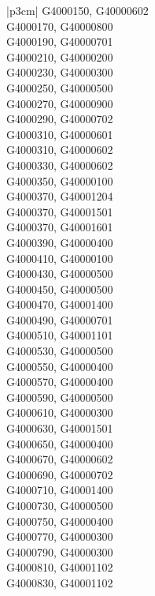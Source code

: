 \begin{customLongTable}{ |p{3cm}| }
G4000150, G40000602 \\ \hline
G4000170, G40000800 \\ \hline
G4000190, G40000701 \\ \hline
G4000210, G40000200 \\ \hline
G4000230, G40000300 \\ \hline
G4000250, G40000500 \\ \hline
G4000270, G40000900 \\ \hline
G4000290, G40000702 \\ \hline
G4000310, G40000601 \\ \hline
G4000310, G40000602 \\ \hline
G4000330, G40000602 \\ \hline
G4000350, G40000100 \\ \hline
G4000370, G40001204 \\ \hline
G4000370, G40001501 \\ \hline
G4000370, G40001601 \\ \hline
G4000390, G40000400 \\ \hline
G4000410, G40000100 \\ \hline
G4000430, G40000500 \\ \hline
G4000450, G40000500 \\ \hline
G4000470, G40001400 \\ \hline
G4000490, G40000701 \\ \hline
G4000510, G40001101 \\ \hline
G4000530, G40000500 \\ \hline
G4000550, G40000400 \\ \hline
G4000570, G40000400 \\ \hline
G4000590, G40000500 \\ \hline
G4000610, G40000300 \\ \hline
G4000630, G40001501 \\ \hline
G4000650, G40000400 \\ \hline
G4000670, G40000602 \\ \hline
G4000690, G40000702 \\ \hline
G4000710, G40001400 \\ \hline
G4000730, G40000500 \\ \hline
G4000750, G40000400 \\ \hline
G4000770, G40000300 \\ \hline
G4000790, G40000300 \\ \hline
G4000810, G40001102 \\ \hline
G4000830, G40001102 \\ \hline

\end{customLongTable}
